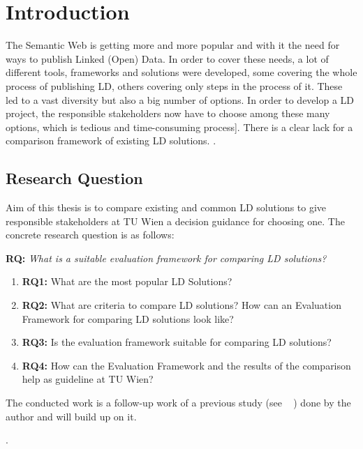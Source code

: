 \chapter{Introduction}

The Semantic Web is getting more and more popular and with it the need for ways to 
publish Linked (Open) Data. In order to cover these needs, a lot of different 
tools, frameworks and solutions were developed, some covering the whole process of 
publishing LD, others covering only steps in the process of it. These led to a 
vast diversity but also a big number of options. In order to develop a LD project, 
the responsible stakeholders now have to choose among these many options, which is 
tedious and time-consuming process]. There is a clear lack for a comparison 
framework of existing LD solutions. .

\section{Research Question}

Aim of this thesis is to compare existing and common LD solutions to give 
responsible stakeholders at TU Wien a decision guidance for choosing one. The 
concrete research question is as follows:

\textbf{RQ:} \textit{What is a suitable evaluation framework for comparing LD solutions?}
\begin{enumerate}
\item \textbf{RQ1:} What are the most popular LD Solutions?
\item \textbf{RQ2:} What are criteria to compare LD solutions? How can an Evaluation Framework for comparing LD solutions look like?
\item \textbf{RQ3:} Is the evaluation framework suitable for comparing LD solutions? 
\item \textbf{RQ4:} How can the Evaluation Framework and the results of the comparison help as guideline at TU Wien?
\end{enumerate}

The conducted work is a follow-up work of a previous study (see ~
\cite{baronyai_publishing_2016}) done by the author and will build up on it.

.


